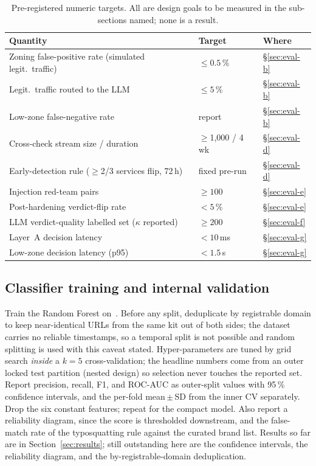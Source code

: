 \documentclass[conference]{IEEEtran}
\begin{document}
\begin{table}[t]
\centering
\caption{Pre-registered numeric targets. All are design goals to be measured in
the sub-sections named; none is a result.}
\label{tab:targets}
\footnotesize
\begin{tabular}{@{}p{}p{}p{}@{}}
\toprule
Quantity & Target & Where \\
\midrule
Zoning false-positive rate (simulated legit.\ traffic) & $\le 0.5\,\%$ & \S\ref{sec:eval-b} \\
Legit.\ traffic routed to the LLM & $\le 5\,\%$ & \S\ref{sec:eval-b} \\
Low-zone false-negative rate & report & \S\ref{sec:eval-b} \\
Cross-check stream size / duration & $\ge$1{,}000 / 4\,wk & \S\ref{sec:eval-d} \\
Early-detection rule ($\ge$2/3 services flip, 72\,h) & fixed pre-run & \S\ref{sec:eval-d} \\
Injection red-team pairs & $\ge 100$ & \S\ref{sec:eval-e} \\
Post-hardening verdict-flip rate & $< 5\,\%$ & \S\ref{sec:eval-e} \\
LLM verdict-quality labelled set ($\kappa$ reported) & $\ge 200$ & \S\ref{sec:eval-f} \\
Layer~A decision latency & $< 10$\,ms & \S\ref{sec:eval-g} \\
Low-zone decision latency (p95) & $< 1.5$\,s & \S\ref{sec:eval-g} \\
\bottomrule
\end{tabular}
\end{table}

\subsection{Classifier training and internal validation}
\label{sec:eval-a}
Train the Random Forest on~\cite{hannousse2021dataset}. Before any split,
deduplicate by registrable domain to keep near-identical URLs from the same kit
out of both sides; the dataset carries no reliable timestamps, so a temporal
split is not possible and random splitting is used with this caveat stated.
Hyper-parameters are tuned by grid search \emph{inside} a $k=5$ cross-validation;
the headline numbers come from an outer locked test partition (nested design) so
selection never touches the reported set. Report precision, recall, F1, and
ROC-AUC as outer-split values with 95\,\% confidence intervals, and the per-fold
mean\,$\pm$\,SD from the inner CV separately. Drop the six constant features;
repeat for the compact model. Also report a reliability diagram, since the score
is thresholded downstream, and the false-match rate of the typosquatting rule
against the curated brand list. Results so far are in Section~\ref{sec:results};
still outstanding here are the confidence intervals, the reliability diagram, and
the by-registrable-domain deduplication.
\end{document}
